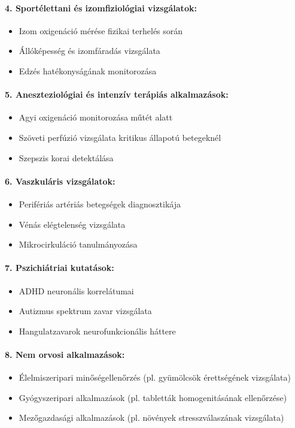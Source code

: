 \documentclass[a4paper,12pt]{article}
\begin{document}
\paragraph{4. Sportélettani és izomfiziológiai vizsgálatok:} \begin{itemize} \item Izom oxigenáció mérése fizikai terhelés során \item Állóképesség és izomfáradás vizsgálata \item Edzés hatékonyságának monitorozása \end{itemize}

\paragraph{5. Aneszteziológiai és intenzív terápiás alkalmazások:} \begin{itemize} \item Agyi oxigenáció monitorozása műtét alatt \item Szöveti perfúzió vizsgálata kritikus állapotú betegeknél \item Szepszis korai detektálása \end{itemize}

\paragraph{6. Vaszkuláris vizsgálatok:} \begin{itemize} \item Perifériás artériás betegségek diagnosztikája \item Vénás elégtelenség vizsgálata \item Mikrocirkuláció tanulmányozása \end{itemize}

\paragraph{7. Pszichiátriai kutatások:} \begin{itemize} \item ADHD neuronális korrelátumai \item Autizmus spektrum zavar vizsgálata \item Hangulatzavarok neurofunkcionális háttere \end{itemize}

\paragraph{8. Nem orvosi alkalmazások:} \begin{itemize} \item Élelmiszeripari minőségellenőrzés (pl. gyümölcsök érettségének vizsgálata) \item Gyógyszeripari alkalmazások (pl. tabletták homogenitásának ellenőrzése) \item Mezőgazdasági alkalmazások (pl. növények stresszválaszának vizsgálata) \end{itemize}
\end{document}
